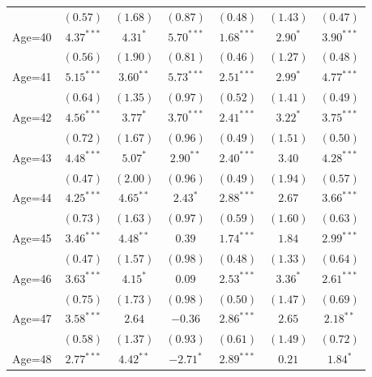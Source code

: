 \documentclass[fullpage]{paper}
\begin{document}
\begin{center}
\begin{longtable}{l c c c c c c }
            & $(0.57)$      & $(1.68)$      & $(0.87)$       & $(0.48)$     & $(1.43)$      & $(0.47)$      \\
Age=40      & $4.37^{***}$  & $4.31^{*}$    & $5.70^{***}$   & $1.68^{***}$ & $2.90^{*}$    & $3.90^{***}$  \\
            & $(0.56)$      & $(1.90)$      & $(0.81)$       & $(0.46)$     & $(1.27)$      & $(0.48)$      \\
Age=41      & $5.15^{***}$  & $3.60^{**}$   & $5.73^{***}$   & $2.51^{***}$ & $2.99^{*}$    & $4.77^{***}$  \\
            & $(0.64)$      & $(1.35)$      & $(0.97)$       & $(0.52)$     & $(1.41)$      & $(0.49)$      \\
Age=42      & $4.56^{***}$  & $3.77^{*}$    & $3.70^{***}$   & $2.41^{***}$ & $3.22^{*}$    & $3.75^{***}$  \\
            & $(0.72)$      & $(1.67)$      & $(0.96)$       & $(0.49)$     & $(1.51)$      & $(0.50)$      \\
Age=43      & $4.48^{***}$  & $5.07^{*}$    & $2.90^{**}$    & $2.40^{***}$ & $3.40$        & $4.28^{***}$  \\
            & $(0.47)$      & $(2.00)$      & $(0.96)$       & $(0.49)$     & $(1.94)$      & $(0.57)$      \\
Age=44      & $4.25^{***}$  & $4.65^{**}$   & $2.43^{*}$     & $2.88^{***}$ & $2.67$        & $3.66^{***}$  \\
            & $(0.73)$      & $(1.63)$      & $(0.97)$       & $(0.59)$     & $(1.60)$      & $(0.63)$      \\
Age=45      & $3.46^{***}$  & $4.48^{**}$   & $0.39$         & $1.74^{***}$ & $1.84$        & $2.99^{***}$  \\
            & $(0.47)$      & $(1.57)$      & $(0.98)$       & $(0.48)$     & $(1.33)$      & $(0.64)$      \\
Age=46      & $3.63^{***}$  & $4.15^{*}$    & $0.09$         & $2.53^{***}$ & $3.36^{*}$    & $2.61^{***}$  \\
            & $(0.75)$      & $(1.73)$      & $(0.98)$       & $(0.50)$     & $(1.47)$      & $(0.69)$      \\
Age=47      & $3.58^{***}$  & $2.64$        & $-0.36$        & $2.86^{***}$ & $2.65$        & $2.18^{**}$   \\
            & $(0.58)$      & $(1.37)$      & $(0.93)$       & $(0.61)$     & $(1.49)$      & $(0.72)$      \\
Age=48      & $2.77^{***}$  & $4.42^{**}$   & $-2.71^{*}$    & $2.89^{***}$ & $0.21$        & $1.84^{*}$    \\

\end{longtable}
\end{center}
\end{document}
